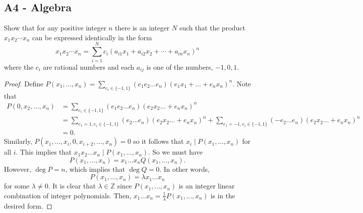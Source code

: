 \documentclass[11pt]{scrartcl}
\newcommand{\Z}{\mathbb{Z}}
\newcommand{\<}{\langle}
\renewcommand{\>}{\rangle}
\begin{document}
\subsection{A4 - Algebra}
Show that for any positive integer $n$ there is an integer $N$ such that the product $x_1x_2\cdots x_n$ can be expressed identically in the form
\[x_1x_2\cdots x_n=\sum_{i=1}^Nc_i(a_{i1}x_1+a_{i2}x_2+\cdots +a_{in}x_n)^n\]
where the $c_i$ are rational numbers and each $a_{ij}$ is one of the numbers, $-1,0,1.$
\begin{proof}
Define $P(x_1, \dots, x_n) = \sum_{e_i \in \{-1, 1\}} (e_1 e_2 \dots e_n) (e_1x_1 + \dots + e_nx_n)^n$.  Note that 
\begin{align*}
P(0, x_2, \dots, x_n) &= \sum_{e_i \in \{-1, 1\}} (e_1 e_2 \dots e_n) (e_2x_2 \dots + e_nx_n)^n \\
&= \sum_{e_1 = 1, e_i \in \{-1, 1\}} (e_2 \dots e_n) (e_2x_2 \dots + e_nx_n)^n +  \sum_{e_1 = -1, e_i \in \{-1, 1\}} (-e_2 \dots e_n) (e_2x_2 \dots + e_nx_n)^n \\
&= 0.
\end{align*}
Similarly, $P(x_1, \dots, x_i, 0, x_{i+2}, \dots, x_n) = 0$ so it follows that $x_i \mid P(x_1, \dots, x_n)$ for all $i$.  This implies that $x_1x_2\dots x_n \mid P(x_1, \dots, x_n)$.  So we must have 
$$P(x_1, \dots, x_n) = x_1\dots x_n Q(x_1, \dots, x_n).$$
However, $\deg P = n$, which implies that $\deg Q = 0$.  In other words,
$$P(x_1, \dots, x_n) = \lambda x_1 \dots x_n$$
for some $\lambda \ne 0$.  It is clear that $\lambda \in \Z$ since $P(x_1, \dots, x_n)$ is an integer linear combination of integer polynomials.  Then, $x_1 \dots x_n = \frac{1}{\lambda}P(x_1, \dots, x_n)$ is in the desired form.  
\end{proof}
\pagebreak
\end{document}
